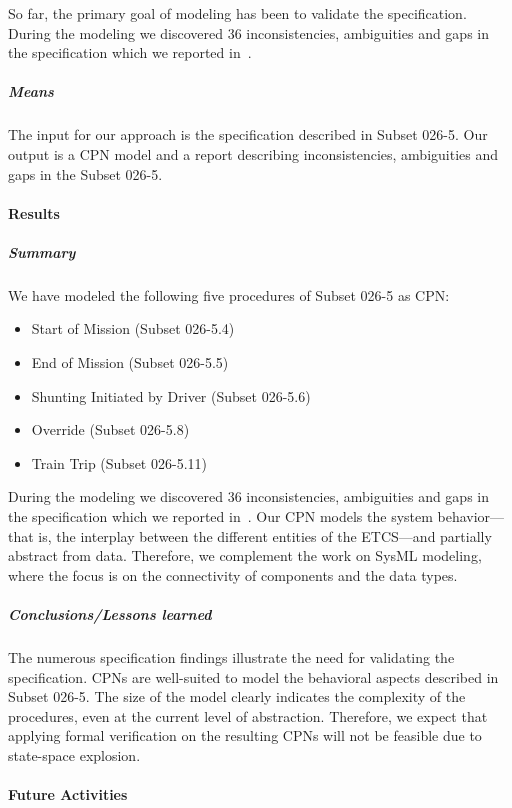 So far, the primary goal of modeling has been to validate the specification. During the modeling we discovered 36 inconsistencies, ambiguities and gaps in the specification which we reported in~\cite{specfindings}. 


\subparagraph{Means}

The input for our approach is the specification described in Subset 026-5. Our output is a CPN model and a report describing inconsistencies, ambiguities and gaps in the Subset 026-5.


\paragraph{Results}

\subparagraph{Summary}

We have modeled the following five procedures of Subset 026-5 as CPN:
\begin{itemize}
	\item Start of Mission (Subset 026-5.4)
	\item End of Mission (Subset 026-5.5)
	\item Shunting Initiated by Driver (Subset 026-5.6)
	\item Override (Subset 026-5.8)
	\item Train Trip (Subset 026-5.11)
\end{itemize}
During the modeling we discovered 36 inconsistencies, ambiguities and gaps in the specification which we reported in~\cite{specfindings}. Our CPN models the system behavior---that is, the interplay between the different entities of the ETCS---and partially abstract from data. Therefore, we complement the work on SysML modeling, where the focus is on the connectivity of components and the data types.
 
\subparagraph{Conclusions/Lessons learned}
 
The numerous specification findings illustrate the need for validating the specification. CPNs are well-suited to model the behavioral aspects described in Subset 026-5. The size of the model clearly indicates the complexity of the procedures, even at the current level of abstraction. Therefore, we expect that applying formal verification on the resulting CPNs will not be feasible due to state-space explosion.

\paragraph{Future Activities}



